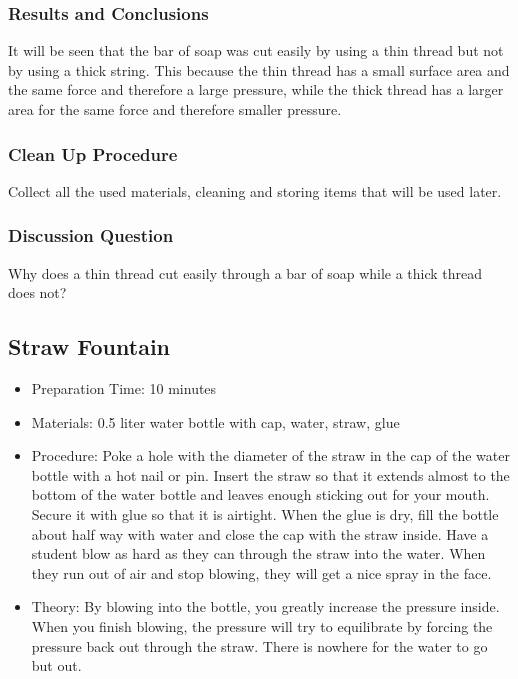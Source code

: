 \subsubsection*{Results and Conclusions}
It will be seen that the bar of soap was cut easily by using a thin thread but not by using a thick string. This because the thin thread has a small surface area and the same force and therefore a large pressure, while the thick thread has a larger area for the same force and therefore smaller pressure. 

\subsubsection*{Clean Up Procedure}
Collect all the used materials, cleaning and storing items that will be used later.

\subsubsection*{Discussion Question}
Why does a thin thread cut easily through a bar of soap while a thick thread does not?




\subsection{Straw Fountain}
\begin{itemize}
\item{Preparation Time: 10 minutes}
\item{Materials: 0.5 liter water bottle with cap, water, straw, glue}
\item{Procedure: Poke a hole with the diameter of the straw in the cap of the water bottle with a hot nail or pin. Insert the straw so that it extends almost to the bottom of the water bottle and leaves enough sticking out for your mouth. Secure it with glue so that it is airtight. When the glue is dry, fill the bottle about half way with water and close the cap with the straw inside. Have a student blow as hard as they can through the straw into the water. When they run out of air and stop blowing, they will get a nice spray in the face. }
\item{Theory: By blowing into the bottle, you greatly increase the pressure inside. When you finish blowing, the pressure will try to equilibrate by forcing the pressure back out through the straw. There is nowhere for the water to go but out.}
\end{itemize}


